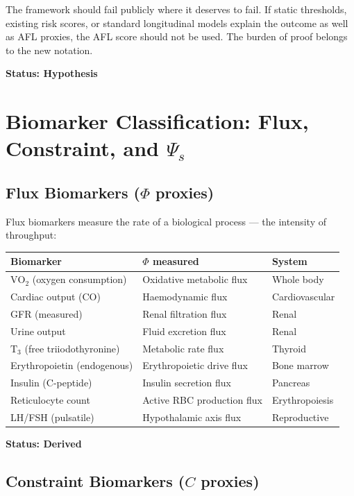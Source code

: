 \documentclass[12pt,a4paper]{article}
\begin{document}
The framework should fail publicly where it deserves to fail. If static thresholds, existing risk scores, or standard longitudinal models explain the outcome as well as AFL proxies, the AFL score should not be used. The burden of proof belongs to the new notation.

\textbf{Status: Hypothesis}

\section{Biomarker Classification: Flux, Constraint, and $\Psi_s$}

\subsection{Flux Biomarkers ($\Phi$ proxies)}

Flux biomarkers measure the rate of a biological process --- the intensity of throughput:

\begin{center}
\begin{tabular}{lll}
\toprule
Biomarker & $\Phi$ measured & System \\
\midrule
$\mathrm{VO}_2$ (oxygen consumption) & Oxidative metabolic flux & Whole body \\
Cardiac output (CO) & Haemodynamic flux & Cardiovascular \\
GFR (measured) & Renal filtration flux & Renal \\
Urine output & Fluid excretion flux & Renal \\
$\mathrm{T}_3$ (free triiodothyronine) & Metabolic rate flux & Thyroid \\
Erythropoietin (endogenous) & Erythropoietic drive flux & Bone marrow \\
Insulin (C-peptide) & Insulin secretion flux & Pancreas \\
Reticulocyte count & Active RBC production flux & Erythropoiesis \\
LH/FSH (pulsatile) & Hypothalamic axis flux & Reproductive \\
\bottomrule
\end{tabular}
\end{center}

\textbf{Status: Derived}

\subsection{Constraint Biomarkers ($C$ proxies)}
\end{document}
